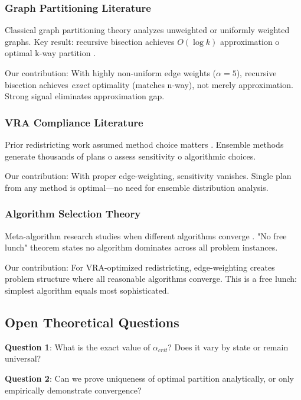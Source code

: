 \subsubsection{Graph Partitioning Literature}

Classical graph partitioning theory analyzes unweighted or uniformly weighted graphs. Key result: recursive bisection achieves $O(\log k)$ approximation 	o optimal k-way partition \citep{karypis1998}.

Our contribution: With highly non-uniform edge weights ($\alpha = 5$), recursive bisection achieves \textit{exact} optimality (matches n-way), not merely approximation. Strong signal eliminates approximation gap.

\subsubsection{VRA Compliance Literature}

Prior redistricting work assumed method choice matters \citep{duchin2018}. Ensemble methods generate thousands of plans 	o assess sensitivity 	o algorithmic choices.

Our contribution: With proper edge-weighting, sensitivity vanishes. Single plan from any method is optimal—no need for ensemble distribution analysis.

\subsubsection{Algorithm Selection Theory}

Meta-algorithm research studies when different algorithms converge \citep{wolpert1997}. "No free lunch" theorem states no algorithm dominates across all problem instances.

Our contribution: For VRA-optimized redistricting, edge-weighting creates problem structure where all reasonable algorithms converge. This is a free lunch: simplest algorithm equals most sophisticated.

\subsection{Open Theoretical Questions}

\textbf{Question 1}: What is the exact value of $\alpha_{crit}$? Does it vary by state or remain universal?

\textbf{Question 2}: Can we prove uniqueness of optimal partition analytically, or only empirically demonstrate convergence?

